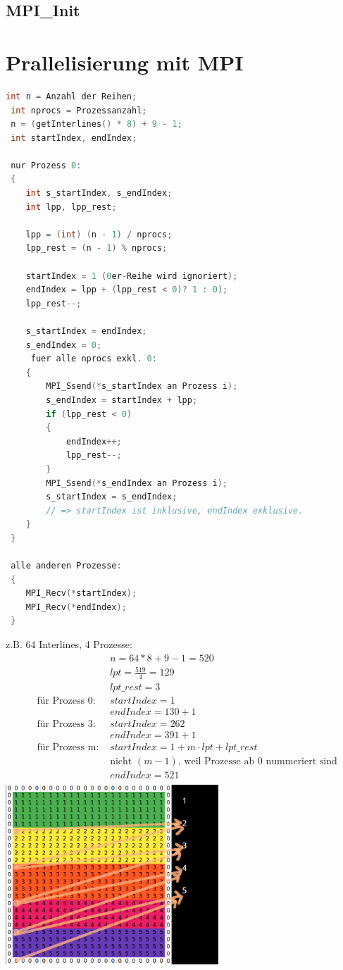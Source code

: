 \documentclass[a4paper,10pt]{article}
\begin{document}
\subsection{MPI\_Init}
\newpage
\section{Prallelisierung mit MPI}

\begin{lstlisting}[language=C]
 int n = Anzahl der Reihen;
 int nprocs = Prozessanzahl;
 n = (getInterlines() * 8) + 9 - 1;
 int startIndex, endIndex;

 nur Prozess 0:
 {
    int s_startIndex, s_endIndex;
    int lpp, lpp_rest;

    lpp = (int) (n - 1) / nprocs;
    lpp_rest = (n - 1) % nprocs;

    startIndex = 1 (0er-Reihe wird ignoriert);
    endIndex = lpp + (lpp_rest < 0)? 1 : 0);
    lpp_rest--;

    s_startIndex = endIndex;
    s_endIndex = 0;
     fuer alle nprocs exkl. 0:
    {
        MPI_Ssend(*s_startIndex an Prozess i);
        s_endIndex = startIndex + lpp;
        if (lpp_rest < 0)
        {
            endIndex++;
            lpp_rest--;
        }
        MPI_Ssend(*s_endIndex an Prozess i);
        s_startIndex = s_endIndex;
        // => startIndex ist inklusive, endIndex exklusive.
    }
 }

 alle anderen Prozesse:
 {
    MPI_Recv(*startIndex);
    MPI_Recv(*endIndex);
 }

\end{lstlisting}

z.B. 64 Interlines, 4 Prozesse:
\begin{align*}
  & &n = 64 * 8 + 9 - 1 = 520\\
  & &lpt = \frac{519}{4} = 129 \\
  & &lpt\_rest = 3 \\
 &\text{für Prozess 0: }
 &startIndex = 1 \\
 & &endIndex = 130 + 1\\
 &\text{für Prozess 3: }
 &startIndex = 262\\
 & &endIndex = 391 + 1\\
 &\text{für Prozess m:  }
 &startIndex = 1 + m \cdot lpt + lpt\_rest \\
  & &\text{nicht $(m - 1)$, weil Prozesse ab 0 nummeriert sind}\\
 & &endIndex = 521\\
\end{align*}
\includegraphics[width=8cm]{Untitled.png}
\end{document}
